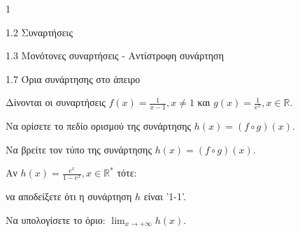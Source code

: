 \begin{ylh}{1}
    \item 1.2 Συναρτήσεις
    \item 1.3 Μονότονες συναρτήσεις - Αντίστροφη συνάρτηση
    \item 1.7 Όρια συνάρτησης στο άπειρο
\end{ylh}
Δίνονται οι συναρτήσεις $f(x)=\frac{1}{x-1}, x \neq 1$ και $g(x)=\frac{1}{e^{x}}, x \in \mathbb{R}$.
\begin{alist}
\item
    \begin{rlist}
    \item Να ορίσετε το πεδίο ορισμού της συνάρτησης $h(x)=(f \circ g)(x)$. 
    \item Να βρείτε τον τύπο της συνάρτησης $h(x)=(f \circ g)(x)$. 
    \end{rlist}
\item Αν $h(x)=\frac{e^{x}}{1-e^{x}}, x \in \mathbb{R}^{*}$ τότε: \par
    να αποδείξετε ότι η συνάρτηση $h$ είναι '1-1'. 
\item Να υπολογίσετε το όριο: $\lim_{x \rightarrow+\infty} h(x)$. 
\end{alist}